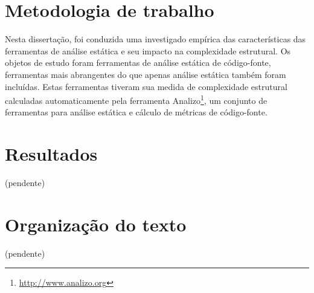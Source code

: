 \section{Metodologia de trabalho}

Nesta dissertação, foi conduzida uma investigado empírica das características
das ferramentas de análise estática e seu impacto na complexidade estrutural.
Os objetos de estudo foram ferramentas de análise estática de código-fonte,
ferramentas mais abrangentes do que apenas análise estática também foram
incluídas.  Estas ferramentas tiveram sua medida de complexidade estrutural
calculadas automaticamente pela ferramenta
Analizo\footnote{\url{http://www.analizo.org}}, um conjunto de ferramentas para
análise estática e cálculo de métricas de código-fonte.

\section{Resultados}

(pendente)

\section{Organização do texto}

(pendente)
